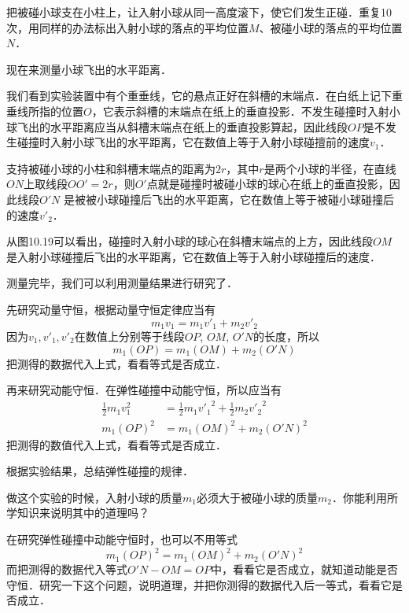 把被碰小球支在小柱上，让入射小球从同一高度滚下，使它们发生正碰．重复10次，用同样的办法标出入射小球的落点的平均位置$M$、被碰小球的落点的平均位置$N$．

现在来测量小球飞出的水平距离．

我们看到实验装置中有个重垂线，它的悬点正好在斜槽的末端点．在白纸上记下重垂线所指的位置$O$，它表示斜槽的末端点在纸上的垂直投影．不发生碰撞时入射小球飞出的水平距离应当从斜槽末端点在纸上的垂直投影算起，因此线段$OP$是不发生碰撞时入射小球飞出的水平距离，它在数值上等于入射小球碰擅前的速度$v_1$．

支持被碰小球的小柱和斜槽末端点的距离为$2r$，其中$r$是两个小球的半径，在直线$ON$上取线段$OO'=2r$，则$O'$点就是碰撞时被碰小球的球心在纸上的垂直投影，因此线段$O'N$ 是被被小球碰撞后飞出的水平距离，它在数值上等于被碰小球碰撞后的速度$v'_2$．

从图10.19可以看出，碰撞时入射小球的球心在斜槽末端点的上方，因此线段$OM$是入射小球碰撞后飞出的水平距离，它在数值上等于入射小球碰撞后的速度．

测量完毕，我们可以利用测量结果进行研究了．

先研究动量守恒，根据动量守恒定律应当有
\[m_1v_1=m_1v'_1+m_2v'_2 \]
因为$v_1, v'_1,v'_2$在数值上分别等于线段$OP$, $OM$, $O'N$的长度，所以
\[m_1(OP)=m_1(OM)+m_2(O'N)\]
把测得的数据代入上式，看看等式是否成立．

再来研究动能守恒．在弹性碰撞中动能守恒，所以应当有
\[\begin{split}
        \frac{1}{2}m_1v_1^2 & =\frac{1}{2}m_1{v'_1}^2+\frac{1}{2}m_2{v'_2}^2 \\
        m_1(OP)^2           & =m_1(OM)^2+m_2(O'N)^2
    \end{split}\]
把测得的数值代入上式，看看等式是否成立．

根据实验结果，总结弹性碰撞的规律．

做这个实验的时候，入射小球的质量$m_1$必须大于被碰小球的质量$m_2$．你能利用所学知识来说明其中的道理吗？

在研究弹性碰撞中动能守恒时，也可以不用等式\[m_1(OP)^2=m_1(OM)^2+m_2(O'N)^2\]而把测得的数据代入等式$O'N-OM=OP$中，看看它是否成立，就知道动能是否守恒．研究一下这个问题，说明道理，并把你测得的数据代入后一等式，看看它是否成立．

\newpage
